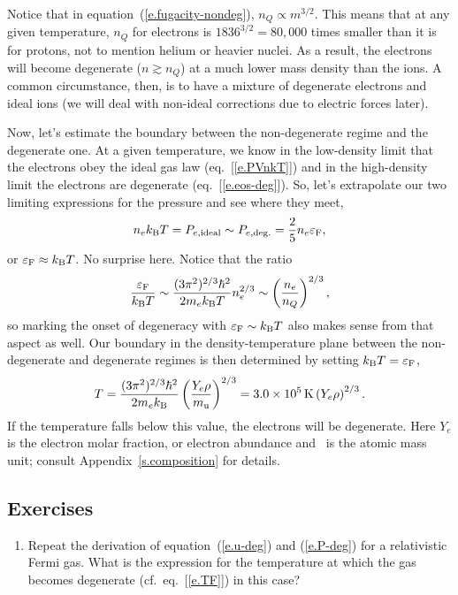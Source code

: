 Notice that in equation~(\ref{e.fugacity-nondeg}), $n_{Q}\propto m^{3/2}$.  This means that at any given temperature, $n_{Q}$ for electrons is $1836^{3/2} = 80,000$ times smaller than it is for protons, not to mention helium or heavier nuclei. As a result, the electrons will become degenerate ($n\gtrsim n_{Q}$) at a much lower mass density than the ions.    A common circumstance, then, is to have a mixture of degenerate electrons and ideal ions (we will deal with non-ideal corrections due to electric forces later).  

Now, let's estimate the boundary between the non-degenerate regime and the degenerate one. At a given temperature, we know in the low-density limit that the electrons obey the ideal gas law (eq.~[\ref{e.PVnkT}]) and in the high-density limit the electrons are degenerate (eq.~[\ref{e.eos-deg}]). So, let's extrapolate our two limiting expressions for the pressure and see where they meet,
\begin{equation}
n_{e}k_\mathrm{B} T = P_{e,\mathrm{ideal}} \sim P_{e,\mathrm{deg.}} 
  = \frac{2}{5}n_{e}\varepsilon_{\mathrm{F}},
\end{equation}
or $\varepsilon_{\mathrm{F}} \approx k_\mathrm{B} T$.  No surprise here.  Notice that the ratio
\begin{equation}
\frac{\varepsilon_{\mathrm{F}}}{k_\mathrm{B} T} \sim \frac{(3\pi^{2})^{2/3}\hbar^{2}}{2m_{e}k_\mathrm{B} T}n_{e}^{2/3} \sim \left(\frac{n_{e}}{n_{Q}}\right)^{2/3},
\end{equation}
so marking the onset of degeneracy with $\varepsilon_{\mathrm{F}}\sim k_\mathrm{B} T$ also makes sense from that aspect as well. Our boundary in the density-temperature plane between the non-degenerate and degenerate regimes is then determined by setting $k_\mathrm{B} T = \varepsilon_{\mathrm{F}}$,
\begin{equation}\label{e.TF}
T = \frac{(3\pi^{2})^{2/3}\hbar^{2}}{2m_{e}k_\mathrm{B} }\left(\frac{Y_{e}\rho}{m_\mathrm{u}}\right)^{2/3} = 3.0\times 10^{5}\,\mathrm{K} \left(Y_{e}\rho\right)^{2/3}.
\end{equation}
If the temperature falls below this value, the electrons will be degenerate. Here $Y_{e}$ is the electron molar fraction, or electron abundance and \mb\ is the atomic mass unit; consult Appendix~\ref{s.composition} for details.

\subsection{Exercises}
\begin{enumerate}
\item Repeat the derivation of equation~(\ref{e.u-deg}) and (\ref{e.P-deg}) for  a relativistic Fermi gas. What is the expression for the temperature at which the gas becomes degenerate (cf.~eq.~[\ref{e.TF}]) in this case?
\end{enumerate}

